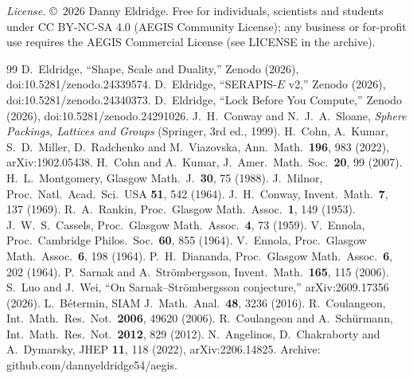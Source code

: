 \documentclass[aps,prd,twocolumn,superscriptaddress,nofootinbib,showkeys]{revtex4-2}
\begin{document}
\emph{License.} \copyright~2026 Danny Eldridge. Free for individuals, scientists and students under CC BY-NC-SA 4.0 (AEGIS Community License); any business or for-profit use requires the AEGIS Commercial License (see LICENSE in the archive).

\begin{thebibliography}{99}
 D.~Eldridge, ``Shape, Scale and Duality,'' Zenodo (2026), doi:10.5281/zenodo.24339574.
 D.~Eldridge, ``SERAPIS-$E$ v2,'' Zenodo (2026), doi:10.5281/zenodo.24340373.
 D.~Eldridge, ``Lock Before You Compute,'' Zenodo (2026), doi:10.5281/zenodo.24291026.
 J.~H.~Conway and N.~J.~A.~Sloane, \emph{Sphere Packings, Lattices and Groups} (Springer, 3rd ed., 1999).
 H.~Cohn, A.~Kumar, S.~D.~Miller, D.~Radchenko and M.~Viazovska, Ann.\ Math.\ \textbf{196}, 983 (2022), arXiv:1902.05438.
 H.~Cohn and A.~Kumar, J.\ Amer.\ Math.\ Soc.\ \textbf{20}, 99 (2007).
 H.~L.~Montgomery, Glasgow Math.\ J.\ \textbf{30}, 75 (1988).
 J.~Milnor, Proc.\ Natl.\ Acad.\ Sci.\ USA \textbf{51}, 542 (1964).
 J.~H.~Conway, Invent.\ Math.\ \textbf{7}, 137 (1969).
 R.~A.~Rankin, Proc.\ Glasgow Math.\ Assoc.\ \textbf{1}, 149 (1953).
 J.~W.~S.~Cassels, Proc.\ Glasgow Math.\ Assoc.\ \textbf{4}, 73 (1959).
 V.~Ennola, Proc.\ Cambridge Philos.\ Soc.\ \textbf{60}, 855 (1964).
 V.~Ennola, Proc.\ Glasgow Math.\ Assoc.\ \textbf{6}, 198 (1964).
 P.~H.~Diananda, Proc.\ Glasgow Math.\ Assoc.\ \textbf{6}, 202 (1964).
 P.~Sarnak and A.~Str\"ombergsson, Invent.\ Math.\ \textbf{165}, 115 (2006).
 S.~Luo and J.~Wei, ``On Sarnak--Str\"ombergsson conjecture,'' arXiv:2609.17356 (2026).
 L.~B\'etermin, SIAM J.\ Math.\ Anal.\ \textbf{48}, 3236 (2016).
 R.~Coulangeon, Int.\ Math.\ Res.\ Not.\ \textbf{2006}, 49620 (2006).
 R.~Coulangeon and A.~Sch\"urmann, Int.\ Math.\ Res.\ Not.\ \textbf{2012}, 829 (2012).
 N.~Angelinos, D.~Chakraborty and A.~Dymarsky, JHEP \textbf{11}, 118 (2022), arXiv:2206.14825.
 Archive: github.com/dannyeldridge54/aegis.
\end{thebibliography}
\end{document}
